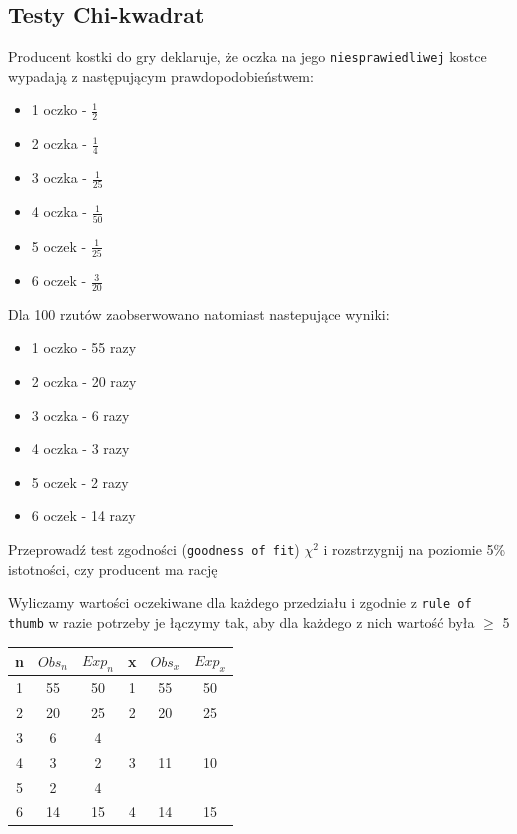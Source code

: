 \documentclass[12pt]{article}
\begin{document}
    \subsection{Testy Chi-kwadrat}
    \begin{exercise}
        Producent kostki do gry deklaruje, że oczka na jego \texttt{niesprawiedliwej} kostce wypadają z następującym prawdopodobieństwem:
        \begin{itemize}
            \item 1 oczko - $\frac{1}{2}$
            \item 2 oczka - $\frac{1}{4}$
            \item 3 oczka - $\frac{1}{25}$
            \item 4 oczka - $\frac{1}{50}$
            \item 5 oczek - $\frac{1}{25}$
            \item 6 oczek - $\frac{3}{20}$
        \end{itemize}
        Dla 100 rzutów zaobserwowano natomiast nastepujące wyniki:
        \begin{itemize}
            \item 1 oczko - 55 razy
            \item 2 oczka - 20 razy
            \item 3 oczka - 6 razy
            \item 4 oczka - 3 razy
            \item 5 oczek - 2 razy
            \item 6 oczek - 14 razy
        \end{itemize}
        Przeprowadź test zgodności (\texttt{goodness of fit}) $\chi^{2}$ i rozstrzygnij na poziomie 5\% istotności, czy producent ma rację
    \end{exercise}

    Wyliczamy wartości oczekiwane dla każdego przedziału i zgodnie z \texttt{rule of thumb} w razie potrzeby je łączymy tak, aby dla każdego z nich wartość była $\geq$ 5

    \begin{table}[H]
        \centering
        \begin{tabular}{|c|c|c|c|c|c|}
            \hline
            n & $Obs_{n}$ & $Exp_{n}$ & x & $Obs_{x}$           & $Exp_{x}$           \\ \hline
            1 & 55 & 50 & 1 & 55 & 50                  \\ \hline
            2 & 20 & 25 & 2 & 20 & 25                  \\ \hline
            3 & 6 & 4 & \multirow{3}{*}{3} & \multirow{3}{*}{11} & \multirow{3}{*}{10} \\ \cline{1-3}
            4 & 3 & 2 & & &                     \\ \cline{1-3}
            5 & 2 & 4 & & &                     \\ \hline
            6 & 14 & 15 & 4 & 14 & 15                  \\ \hline
        \end{tabular}
    \end{table}
\end{document}

